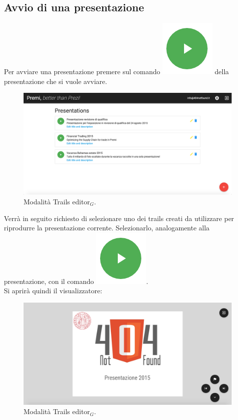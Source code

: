 \subsection{Avvio di una presentazione}
Per avviare una presentazione premere sul comando \includegraphics[scale=0.5]{img/play.png} della presentazione che si vuole avviare.\\

\begin{figure}[!h]
\begin{center}
\includegraphics[scale=0.35]{img/dashboard.png}
\caption{Modalità Trails editor$_G$.}
\end{center}
\end{figure}

Verrà in seguito richiesto di selezionare uno dei trails creati da utilizzare per riprodurre la presentazione corrente. Selezionarlo, analogamente alla presentazione, con il comando \includegraphics[scale=0.5]{img/play.png}.\\
Si aprirà quindi il visualizzatore:

\begin{figure}[!h]
\begin{center}
\includegraphics[scale=0.3]{img/viewer.png}
\caption{Modalità Trails editor$_G$.}
\end{center}
\end{figure}

